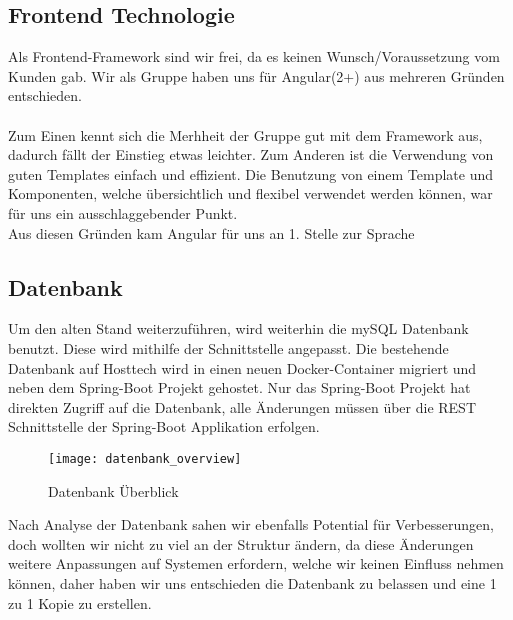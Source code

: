 \documentclass[../main.tex]{subfiles}
\begin{document}
	\subsection{Frontend Technologie}
	Als Frontend-Framework sind wir frei, da es keinen Wunsch/Voraussetzung vom Kunden gab.
	Wir als Gruppe haben uns für Angular(2+) aus mehreren Gründen entschieden. \\
	\\
	Zum Einen kennt sich die Merhheit der Gruppe gut mit dem Framework aus, dadurch fällt der Einstieg etwas leichter. Zum Anderen ist die Verwendung von guten Templates einfach und effizient. Die Benutzung von einem Template und Komponenten, welche übersichtlich und flexibel verwendet werden können, war für uns ein ausschlaggebender Punkt. \\ 
	Aus diesen Gründen kam Angular für uns an 1. Stelle zur Sprache
	
	
	\subsection{Datenbank}
	Um den alten Stand weiterzuführen, wird weiterhin die mySQL Datenbank benutzt. Diese wird mithilfe der Schnittstelle angepasst.
	Die bestehende Datenbank auf Hosttech wird in einen neuen Docker-Container migriert und neben dem Spring-Boot Projekt gehostet. Nur das Spring-Boot Projekt hat direkten Zugriff auf die Datenbank, alle Änderungen müssen über die REST Schnittstelle der Spring-Boot Applikation erfolgen.
	
	\begin{figure}[H]
		\centering
		\texttt{[image: datenbank\_overview]}
		\caption{Datenbank Überblick}
		\label{fig:datenbank_overview}
	\end{figure}
	
	Nach Analyse der Datenbank sahen wir ebenfalls Potential für Verbesserungen, doch wollten wir nicht zu viel an der Struktur ändern, da diese Änderungen weitere Anpassungen auf Systemen erfordern, welche wir keinen Einfluss nehmen können, daher haben wir uns entschieden die Datenbank zu belassen und eine 1 zu 1 Kopie zu erstellen.
\end{document}
